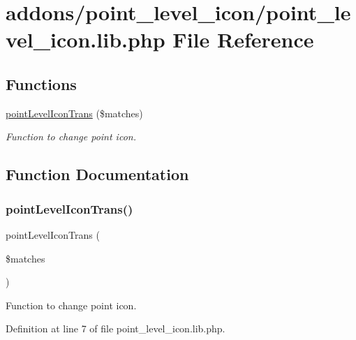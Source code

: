 \hypertarget{point__level__icon_8lib_8php}{}\section{addons/point\+\_\+level\+\_\+icon/point\+\_\+level\+\_\+icon.lib.\+php File Reference}
\label{point__level__icon_8lib_8php}
\subsection*{Functions}
\begin{DoxyCompactItemize}
\item 
\hyperlink{point__level__icon_8lib_8php_a6581bcaf11de4c31924e7a5de3d6887d}{point\+Level\+Icon\+Trans} (\$matches)
\begin{DoxyCompactList}\small\item\em Function to change point icon. \end{DoxyCompactList}\end{DoxyCompactItemize}


\subsection{Function Documentation}
\mbox{\label{point__level__icon_8lib_8php_a6581bcaf11de4c31924e7a5de3d6887d}} 
\subsubsection{\texorpdfstring{point\+Level\+Icon\+Trans()}{pointLevelIconTrans()}}
{\footnotesize\ttfamily point\+Level\+Icon\+Trans (\begin{DoxyParamCaption}\item[{}]{\$matches }\end{DoxyParamCaption})}



Function to change point icon. 



Definition at line 7 of file point\+\_\+level\+\_\+icon.\+lib.\+php.

